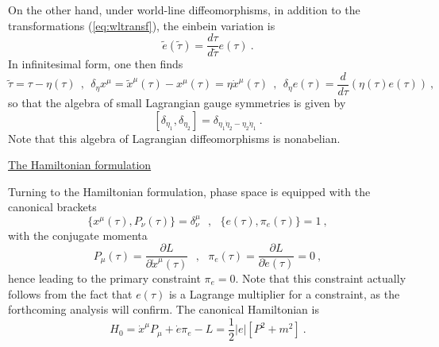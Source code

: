 \documentclass[a4paper,11pt]{article}
\begin{document}
On the other hand, under world-line diffeomorphisms, in addition to
the transformations (\ref{eq:wltransf}), the einbein variation is
\begin{equation}
\tilde{e}(\tilde{\tau})=\frac{d\tau}{d\tilde{\tau}}e(\tau)\ .
\end{equation}
In infinitesimal form, one then finds
\begin{equation}
\tilde{\tau}=\tau-\eta(\tau)\ \ ,\ \ 
\delta_\eta x^\mu=\tilde{x}^\mu(\tau)-x^\mu(\tau)=\eta\dot{x}^\mu(\tau)\ \ ,\ \ 
\delta_\eta e(\tau)=\frac{d}{d\tau}\left(\eta(\tau)e(\tau)\right)\ ,
\end{equation}
so that the algebra of small Lagrangian gauge symmetries is given by
\begin{equation}
\left[\delta_{\eta_1},\delta_{\eta_2}\right]=
\delta_{\eta_1\dot{\eta}_2-\eta_2\dot{\eta}_1}\ .
\end{equation}
Note that this algebra of Lagrangian diffeomorphisms is nonabelian.

\vspace{10pt}

\noindent\underline{The Hamiltonian formulation}

\vspace{5pt}

Turning to the Hamiltonian formulation, phase space is equipped with
the canonical brackets
\begin{equation}
\{x^\mu(\tau),P_\nu(\tau)\}=\delta^\mu_\nu\ \ \ ,\ \ \ 
\{e(\tau),\pi_e(\tau)\}=1\ ,
\end{equation}
with the conjugate momenta
\begin{equation}
P_\mu(\tau)=\frac{\partial L}{\partial\dot{x}^\mu(\tau)}\ \ \ ,\ \ \ 
\pi_e(\tau)=\frac{\partial L}{\partial\dot{e}(\tau)}=0\ ,
\end{equation}
hence leading to the primary constraint $\pi_e=0$. Note that this constraint
actually follows from the fact that $e(\tau)$ is a Lagrange multiplier
for a constraint, as the forthcoming analysis will confirm.
The canonical Hamiltonian is
\begin{equation}
H_0=\dot{x}^\mu P_\mu+\dot{e}\pi_e-L=\frac{1}{2}|e|\left[P^2+m^2\right]\ .
\end{equation}
\end{document}
